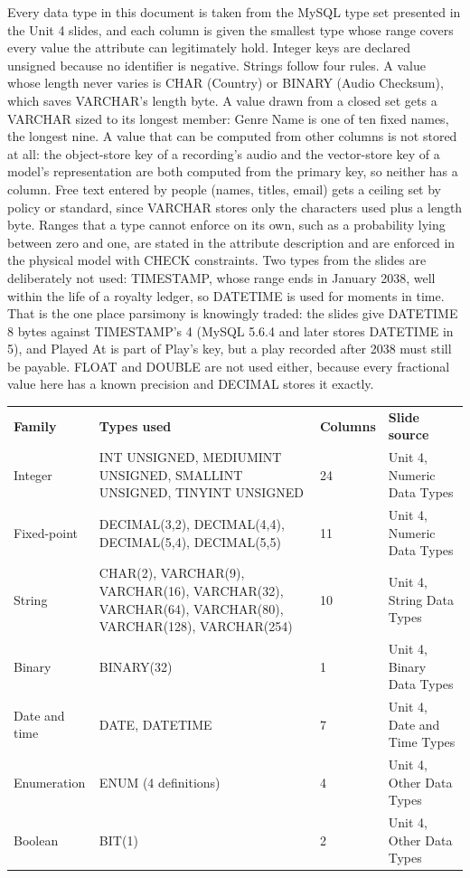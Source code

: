 \documentclass[11pt]{article}
\begin{document}
Every data type in this document is taken from the MySQL type set presented in the Unit 4
slides, and each column is given the smallest type whose range covers every value the
attribute can legitimately hold. Integer keys are declared unsigned because no identifier
is negative. Strings follow four rules. A value whose length never varies is CHAR (Country) or
BINARY (Audio Checksum), which saves VARCHAR's length byte. A value drawn from a closed
set gets a VARCHAR sized to its longest member: Genre Name is one of ten fixed names, the
longest nine. A value that can be computed from other columns is not stored at all: the
object-store key of a recording's audio and the vector-store key of a model's representation
are both computed from the primary key, so neither has a column. Free text entered by people (names, titles, email) gets a ceiling set by policy or
standard, since VARCHAR stores only the characters used plus a length byte. Ranges that a type cannot enforce on its own, such as a probability lying
between zero and one, are stated in the attribute description and are enforced in the
physical model with CHECK constraints. Two types from the slides are deliberately not used:
TIMESTAMP, whose range ends in January 2038, well within the life of a royalty ledger, so
DATETIME is used for moments in time. That is the one place parsimony is knowingly traded:
the slides give DATETIME 8 bytes against TIMESTAMP's 4 (MySQL 5.6.4 and later stores DATETIME
in 5), and Played At is part of Play's key, but a play recorded after 2038 must still be payable. FLOAT and DOUBLE are not used either, because every fractional value
here has a known precision and DECIMAL stores it exactly.

\begin{longtable}{|L{1.10in}|T{2.50in}|L{0.70in}|L{1.98in}|}
\hline
{} \\ \hline
{}\textbf{Family} & \textbf{Types used} & \textbf{Columns} & \textbf{Slide source} \\ \hline
Integer & INT UNSIGNED, MEDIUMINT UNSIGNED, SMALLINT UNSIGNED, TINYINT UNSIGNED & 24 & Unit 4, Numeric Data Types \\ \hline
Fixed-point & DECIMAL(3,2), DECIMAL(4,4), DECIMAL(5,4), DECIMAL(5,5) & 11 & Unit 4, Numeric Data Types \\ \hline
String & CHAR(2), VARCHAR(9), VARCHAR(16), VARCHAR(32), VARCHAR(64), VARCHAR(80), VARCHAR(128), VARCHAR(254) & 10 & Unit 4, String Data Types \\ \hline
Binary & BINARY(32) & 1 & Unit 4, Binary Data Types \\ \hline
Date and time & DATE, DATETIME & 7 & Unit 4, Date and Time Types \\ \hline
Enumeration & ENUM (4 definitions) & 4 & Unit 4, Other Data Types \\ \hline
Boolean & BIT(1) & 2 & Unit 4, Other Data Types \\ \hline
\end{longtable}
\end{document}
